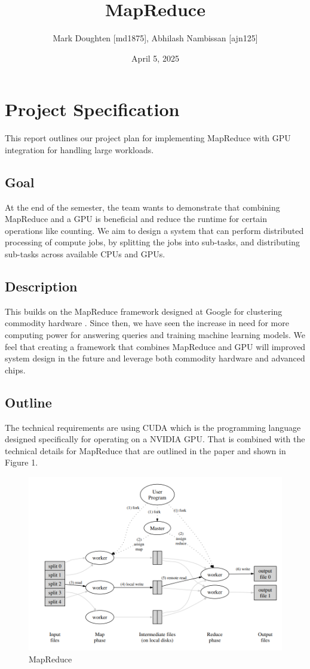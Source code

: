 \documentclass{article}
\title{MapReduce}
\author{Mark Doughten [md1875], Abhilash Nambissan [ajn125]}
\date{April 5, 2025}
\begin{document}
\maketitle
\section{Project Specification}

This report outlines our project plan for implementing MapReduce with GPU integration for handling large workloads.

\subsection{Goal}
At the end of the semester, the team wants to demonstrate that combining MapReduce and a GPU is beneficial and reduce the runtime for certain operations like counting. We aim to design a system that can perform distributed processing of compute jobs, by splitting the jobs into sub-tasks, and distributing sub-tasks across available CPUs and GPUs.

\subsection{Description}
This builds on the MapReduce framework designed at Google for clustering commodity hardware \cite{mapreduce}. Since then, we have seen the increase in need for more computing power for answering queries and training machine learning models. We feel that creating a framework that combines MapReduce and GPU will improved system design in the future and leverage both commodity hardware and advanced chips. 

\subsection{Outline}
The technical requirements are using CUDA which is the programming language designed specifically for operating on a NVIDIA GPU. That is combined with the technical details for MapReduce that are outlined in the paper \cite{mapreduce} and shown in Figure 1. 

\begin{figure}[ht]
    \centering
    \includegraphics[width=1\linewidth]{./images/mapreduce.png}
    \caption{MapReduce \cite{mapreduce}}
    \label{fig:chroot}
\end{figure}
\end{document}
